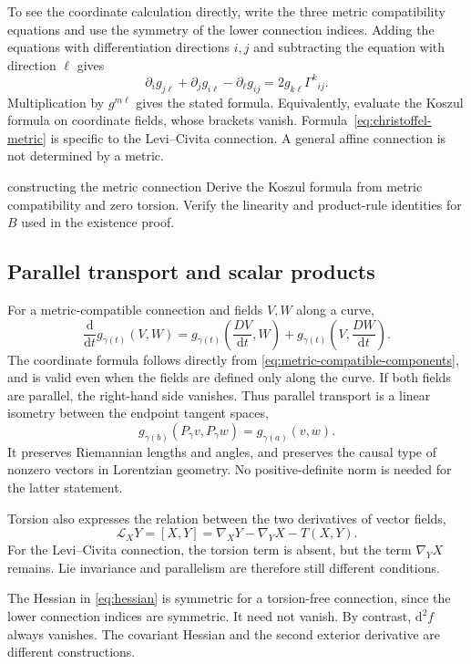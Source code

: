 \documentclass[11pt,a4paper]{article}
\numberwithin{equation}{section}
\newcommand{\dd}{\mathrm d}
\newcommand{\Lie}{\mathcal L}
\begin{document}
To see the coordinate calculation directly, write the three metric
compatibility equations and use the symmetry of the lower connection indices.
Adding the equations with differentiation directions \(i,j\) and subtracting
the equation with direction \(\ell\) gives
\[
 \partial_i g_{j\ell}+\partial_j g_{i\ell}-\partial_\ell g_{ij}
 =2g_{k\ell}\Gamma^k{}_{ij}.
\]
Multiplication by \(g^{m\ell}\) gives the stated formula. Equivalently,
evaluate the Koszul formula on coordinate fields, whose brackets vanish.
Formula~\eqref{eq:christoffel-metric} is specific to the Levi--Civita
connection. A general affine connection is not determined by a metric.

\Needspace{6.5cm}
\begin{studentwork}[4.4cm]{constructing the metric connection}
Derive the Koszul formula from metric compatibility and zero torsion.
Verify the linearity and product-rule identities for \(B\) used in the
existence proof.
\end{studentwork}

\subsection{Parallel transport and scalar products}

For a metric-compatible connection and fields \(V,W\) along a curve,
\begin{equation}
 \label{eq:metric-transport}
 \frac{\dd}{\dd t}g_{\gamma(t)}(V,W)
 =g_{\gamma(t)}\left(\frac{DV}{\dd t},W\right)
  +g_{\gamma(t)}\left(V,\frac{DW}{\dd t}\right).
\end{equation}
The coordinate formula follows directly from
\eqref{eq:metric-compatible-components}, and is valid even when the fields
are defined only along the curve. If both fields are parallel, the
right-hand side vanishes. Thus parallel transport is a linear isometry
between the endpoint tangent spaces,
\[
 g_{\gamma(b)}(P_\gamma v,P_\gamma w)
 =g_{\gamma(a)}(v,w).
\]
It preserves Riemannian lengths and angles, and preserves the causal type of
nonzero vectors in Lorentzian geometry. No positive-definite norm is needed
for the latter statement.

Torsion also expresses the relation between the two derivatives of vector
fields,
\[
 \Lie_XY=[X,Y]=\nabla_XY-\nabla_YX-T(X,Y).
\]
For the Levi--Civita connection, the torsion term is absent, but the term
\(\nabla_YX\) remains. Lie invariance and parallelism are therefore still
different conditions.

The Hessian in \eqref{eq:hessian} is symmetric for a torsion-free
connection, since the lower connection indices are symmetric. It need
not vanish. By contrast, \(\dd^2f\) always vanishes. The covariant
Hessian and the second exterior derivative are different constructions.
\end{document}
